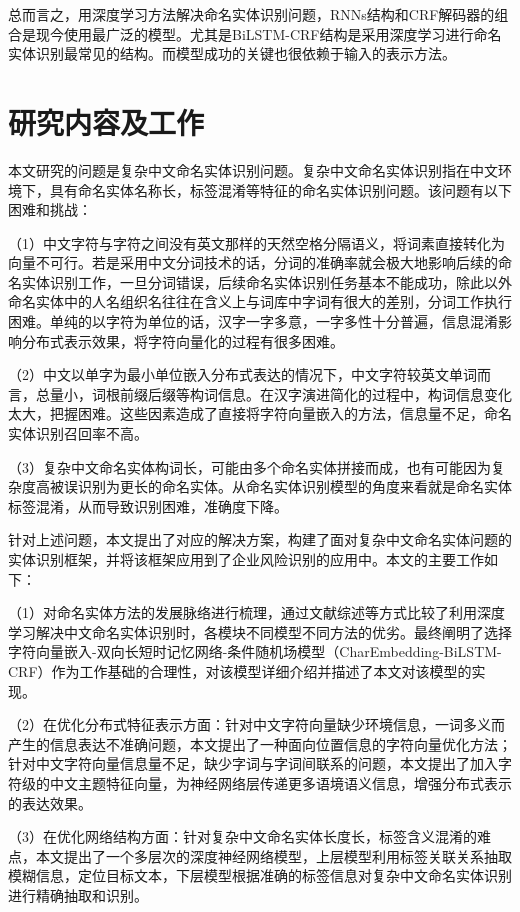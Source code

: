 \documentclass[winfonts,master,oneside,nobackinfo]{njuthesis}
\begin{document}
总而言之，用深度学习方法解决命名实体识别问题，RNNs结构和CRF解码器的组合是现今使用最广泛的模型。尤其是BiLSTM-CRF结构是采用深度学习进行命名实体识别最常见的结构。而模型成功的关键也很依赖于输入的表示方法。

\section{研究内容及工作}
本文研究的问题是复杂中文命名实体识别问题。复杂中文命名实体识别指在中文环境下，具有命名实体名称长，标签混淆等特征的命名实体识别问题。该问题有以下困难和挑战：

（1）中文字符与字符之间没有英文那样的天然空格分隔语义，将词素直接转化为向量不可行。若是采用中文分词技术的话，分词的准确率就会极大地影响后续的命名实体识别工作，一旦分词错误，后续命名实体识别任务基本不能成功，除此以外命名实体中的人名组织名往往在含义上与词库中字词有很大的差别，分词工作执行困难。单纯的以字符为单位的话，汉字一字多意，一字多性十分普遍，信息混淆影响分布式表示效果，将字符向量化的过程有很多困难。

（2）中文以单字为最小单位嵌入分布式表达的情况下，中文字符较英文单词而言，总量小，词根前缀后缀等构词信息。在汉字演进简化的过程中，构词信息变化太大，把握困难。这些因素造成了直接将字符向量嵌入的方法，信息量不足，命名实体识别召回率不高。

（3）复杂中文命名实体构词长，可能由多个命名实体拼接而成，也有可能因为复杂度高被误识别为更长的命名实体。从命名实体识别模型的角度来看就是命名实体标签混淆，从而导致识别困难，准确度下降。

针对上述问题，本文提出了对应的解决方案，构建了面对复杂中文命名实体问题的实体识别框架，并将该框架应用到了企业风险识别的应用中。本文的主要工作如下：

（1）对命名实体方法的发展脉络进行梳理，通过文献综述等方式比较了利用深度学习解决中文命名实体识别时，各模块不同模型不同方法的优劣。最终阐明了选择字符向量嵌入-双向长短时记忆网络-条件随机场模型（CharEmbedding-BiLSTM-CRF）作为工作基础的合理性，对该模型详细介绍并描述了本文对该模型的实现。

（2）在优化分布式特征表示方面：针对中文字符向量缺少环境信息，一词多义而产生的信息表达不准确问题，本文提出了一种面向位置信息的字符向量优化方法；针对中文字符向量信息量不足，缺少字词与字词间联系的问题，本文提出了加入字符级的中文主题特征向量，为神经网络层传递更多语境语义信息，增强分布式表示的表达效果。

（3）在优化网络结构方面：针对复杂中文命名实体长度长，标签含义混淆的难点，本文提出了一个多层次的深度神经网络模型，上层模型利用标签关联关系抽取模糊信息，定位目标文本，下层模型根据准确的标签信息对复杂中文命名实体识别进行精确抽取和识别。
\end{document}
